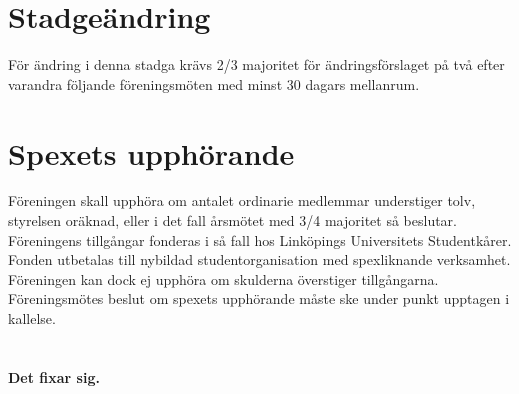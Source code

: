 \documentclass[a4paper]{article}
\begin{document}
\section{Stadgeändring}
För ändring i denna stadga krävs 2/3 majoritet för ändringsförslaget på två efter varandra följande föreningsmöten med minst 30 dagars mellanrum.

\section{Spexets upphörande}
Föreningen skall upphöra om antalet ordinarie medlemmar understiger tolv, styrelsen oräknad, eller i det fall årsmötet med 3/4 majoritet så beslutar. Föreningens tillgångar fonderas i så fall hos Linköpings Universitets Studentkårer. Fonden utbetalas till nybildad studentorganisation med spexliknande verksamhet. Föreningen kan dock ej upphöra om skulderna överstiger tillgångarna. Föreningsmötes beslut om spexets upphörande måste ske under punkt upptagen i kallelse.

\setcounter{section}{16}
\section{ }
\textbf{Det fixar sig.}
\end{document}
